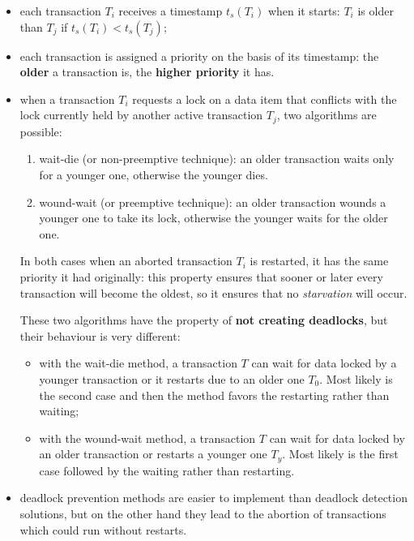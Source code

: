 \begin{itemize}
    \item each transaction $T_i$ receives a timestamp $t_s(T_i)$ when it starts: $T_i$ is older than $T_j$ if $t_s(T_i) < t_s(T_j)$;

    \item each transaction is assigned a priority on the basis of its timestamp: the \textbf{older} a transaction is, the \textbf{higher priority} it has. 
    
    \item when a transaction $T_i$ requests a lock on a data item that conflicts with the lock currently held by another active transaction $T_j$, two algorithms are possible:

    \begin{enumerate}
    
        \item wait-die (or non-preemptive technique): an older transaction waits only for a younger one, otherwise the younger dies.
        
        \item wound-wait (or preemptive technique): an older transaction wounds a younger one to take its lock, otherwise the younger waits for the older one.
        
    \end{enumerate}
    
    
    In both cases when an aborted transaction $T_i$ is restarted, it has the same priority it had originally: this property ensures that sooner or later every transaction will become the oldest, so it ensures that no \textit{starvation} will occur.

    These two algorithms have the property of \textbf{not creating deadlocks}, but their behaviour is very different:

    \begin{itemize}

        \item with the wait-die method, a transaction $T$ can wait for data locked by a younger transaction or it restarts due to an older one $T_0$. Most likely is the second case and then the method favors the restarting rather than waiting;
    
        \item with the wound-wait method, a transaction $T$ can wait for data locked by an older transaction or restarts a younger one $T_y$. Most likely is the first case followed by the waiting rather than restarting.
        
    \end{itemize}

    \item deadlock prevention methods are easier to implement than deadlock detection solutions, but on the other hand they lead to the abortion of transactions which could run without restarts.
    
\end{itemize}

